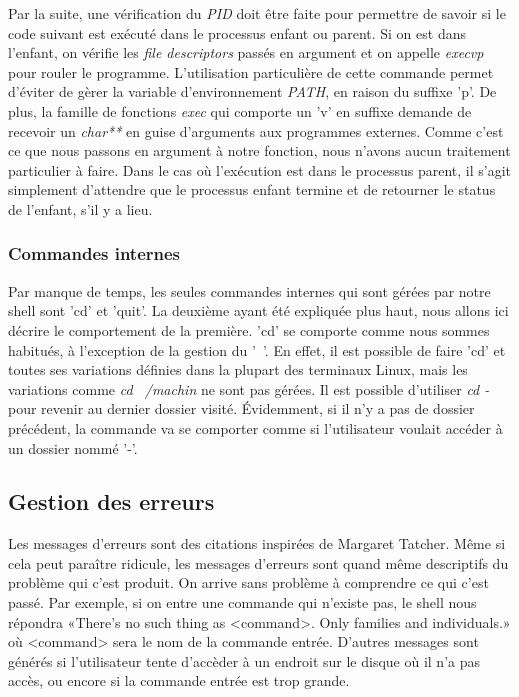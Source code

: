 \documentclass[letterpaper,12pt]{scrartcl}
\begin{document}
			Par la suite, une vérification du \textit{PID} doit être faite pour permettre de savoir si le code suivant est exécuté dans le processus enfant ou parent. Si on est dans l'enfant, on vérifie les \textit{file descriptors} passés en argument et on appelle \textit{execvp} pour rouler le programme. L'utilisation particulière de cette commande permet d'éviter de gèrer la variable d'environnement \textit{PATH}, en raison du suffixe 'p'. De plus, la famille de fonctions \textit{exec} qui comporte un 'v' en suffixe demande de recevoir un \textit{char**} en guise d'arguments aux programmes externes. Comme c'est ce que nous passons en argument à notre fonction, nous n'avons aucun traitement particulier à faire. Dans le cas où l'exécution est dans le processus parent, il s'agit simplement d'attendre que le processus enfant termine et de retourner le status de l'enfant, s'il y a lieu.

			\subsubsection{Commandes internes}
				Par manque de temps, les seules commandes internes qui sont gérées par notre shell sont 'cd' et 'quit'. La deuxième ayant été expliquée plus haut, nous allons ici décrire le comportement de la première. 'cd' se comporte comme nous sommes habitués, à l'exception de la gestion du '~'. En effet, il est possible de faire 'cd' et toutes ses variations définies dans la plupart des terminaux Linux, mais les variations comme \textit{cd ~/machin} ne sont pas gérées. Il est possible d'utiliser \textit{cd -} pour revenir au dernier dossier visité. Évidemment, si il n'y a pas de dossier précédent, la commande va se comporter comme si l'utilisateur voulait accéder à un dossier nommé '-'.

		\subsection{Gestion des erreurs}
			Les messages d'erreurs sont des citations inspirées de Margaret Tatcher. Même si cela peut paraître ridicule, les messages
		d'erreurs sont quand même descriptifs du problème qui c'est produit. On arrive sans problème à comprendre ce qui c'est passé. Par exemple, si on entre une commande qui n'existe pas, le shell nous répondra «There's no such thing as <command>. Only families and individuals.» où <command> sera le nom de la commande entrée. D'autres messages sont générés si l'utilisateur tente d'accèder à un endroit sur le disque où il n'a pas accès, ou encore si la commande entrée est trop grande. 
\end{document}
